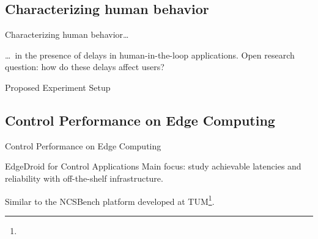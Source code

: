 \documentclass[aspectratio=1610]{beamer}
\begin{document}
\subsection{Characterizing human behavior}
\begin{frame}{Characterizing human behavior\ldots}
    \begin{block}{\ldots~in the presence of delays in human-in-the-loop applications.}
        Open research question: how do these delays affect users?
    \end{block}
    \begin{center}
        
    \end{center}
\end{frame}

\begin{frame}{Proposed Experiment Setup}
    \begin{center}
        
    \end{center}
\end{frame}

\subsection{Control Performance on Edge Computing}
\begin{frame}{Control Performance on Edge Computing}
    \begin{block}{EdgeDroid for Control Applications}
        Main focus: study achievable latencies and reliability with off-the-shelf infrastructure.

        Similar to the NCSBench platform developed at TUM\footnote{}\autocite{ncsbench}.
    \end{block}

    \vspace{2em}
    \begin{center}
        
    \end{center}

\end{frame}
\end{document}
